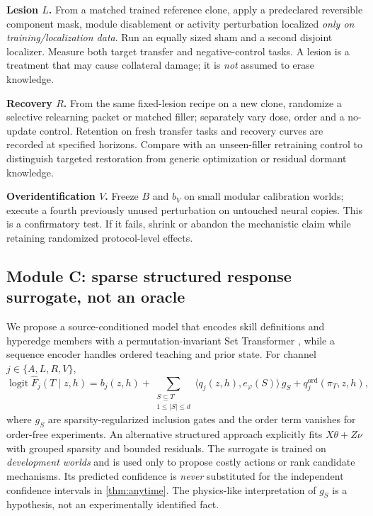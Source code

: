 \documentclass[11pt,a4paper]{article}
\theoremstyle{definition}\newtheorem{definition}[theorem]{Definition}
\theoremstyle{remark}\newtheorem{remark}[theorem]{Remark}
\begin{document}
\textbf{Lesion $L$.} From a matched trained reference clone, apply a predeclared reversible component mask, module disablement or activity perturbation localized \emph{only on training/localization data}. Run an equally sized sham and a second disjoint localizer. Measure both target transfer and negative-control tasks. A lesion is a treatment that may cause collateral damage; it is \emph{not} assumed to erase knowledge.

\textbf{Recovery $R$.} From the same fixed-lesion recipe on a new clone, randomize a selective relearning packet or matched filler; separately vary dose, order and a no-update control. Retention on fresh transfer tasks and recovery curves are recorded at specified horizons. Compare with an unseen-filler retraining control to distinguish targeted restoration from generic optimization or residual dormant knowledge.

\textbf{Overidentification $V$.} Freeze $B$ and $b_V$ on small modular calibration worlds; execute a fourth previously unused perturbation on untouched neural copies. This is a confirmatory test. If it fails, shrink or abandon the mechanistic claim while retaining randomized protocol-level effects.

\subsection{Module C: sparse structured response surrogate, not an oracle}
We propose a source-conditioned model that encodes skill definitions and hyperedge members with a permutation-invariant Set Transformer \citep{settransformer}, while a sequence encoder handles ordered teaching and prior state. For channel $j\in\{A,L,R,V\}$,
\begin{equation}\label{eq:surrogate}
 \operatorname{logit}\widehat F_j(T\mid z,h)
 =b_j(z,h)+\sum_{\substack{S\subseteq T\\1\le|S|\le d}}
 \langle q_j(z,h),e_\varphi(S)\rangle\,g_S+q^{\mathrm{ord}}_j(\pi_T,z,h),
\end{equation}
where $g_S$ are sparsity-regularized inclusion gates and the order term vanishes for order-free experiments. An alternative structured approach explicitly fits $X\theta+Z\nu$ with grouped sparsity and bounded residuals. The surrogate is trained on \emph{development worlds} and is used only to propose costly actions or rank candidate mechanisms. Its predicted confidence is \emph{never} substituted for the independent confidence intervals in \cref{thm:anytime}. The physics-like interpretation of $g_S$ is a hypothesis, not an experimentally identified fact.
\end{document}
